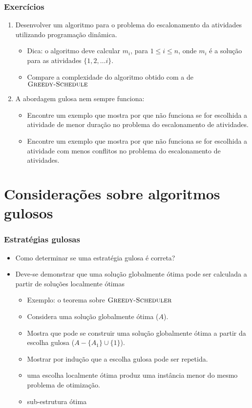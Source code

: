 \documentclass{beamer}
\begin{document}

\begin{frame}
\frametitle{Exercícios}
\begin{enumerate}
\item Desenvolver um algoritmo para o problema do escalonamento da atividades utilizando \alert{programação dinâmica}.
\begin{itemize}
\item Dica: o algoritmo deve calcular $m_i$, para $1 \le i \le n$, onde $m_i$ é 
a solução para as atividades $\{1, 2, \ldots i\}$.
\item Compare a complexidade do algoritmo obtido com a de $\textnormal{\scshape Greedy-Schedule}$
\end{itemize}
\item A abordagem gulosa nem sempre funciona:
\begin{itemize}
\item Encontre um exemplo que mostra por que não funciona se for escolhida a atividade de menor duração no problema do escalonamento de atividades.
\item Encontre um exemplo que mostra por que não funciona se for escolhida a atividade com menos conflitos no problema do escalonamento de atividades.
\end{itemize}
\end{enumerate}
\end{frame}

\section{Considerações sobre algoritmos gulosos}


\begin{frame}
\frametitle{Estratégias gulosas}

\begin{itemize}
\item Como determinar se uma estratégia gulosa é correta?
\item Deve-se demonstrar que uma solução globalmente ótima pode ser
calculada a partir de soluções localmente ótimas
\begin{itemize}
\item Exemplo: o teorema sobre $\textnormal{\scshape Greedy-Scheduler}$
\item Considera uma solução globalmente ótima ($A$).
\item Mostra que pode se construir uma solução globalmente ótima a partir
da escolha gulosa ($A - \{ A_1 \} \cup \{ 1 \}$).
\item Mostrar por indução que a escolha gulosa pode ser repetida.
\item uma escolha localmente ótima produz uma instância menor do
mesmo problema de otimização.
\item \alert{sub-estrutura ótima}
\end{itemize}
\end{itemize}

\end{frame}
\end{document}
